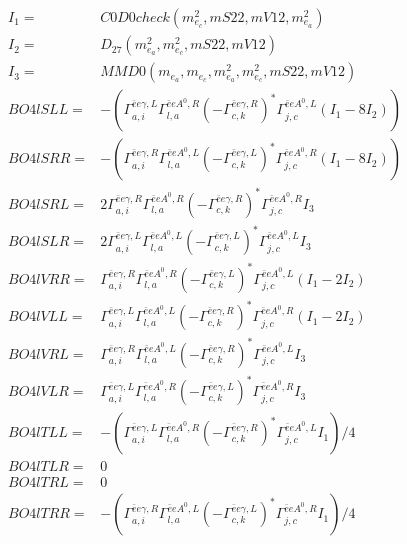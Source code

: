 \documentclass[A4,landscape]{article}
\begin{document}
\begin{align} 
I_1 = & C0D0check(m^2_{e_{{c}}}, mS22, mV12, m^2_{e_{{a}}}) \\ 
I_2 = & D_{27}(m^2_{e_{{a}}}, m^2_{e_{{c}}}, mS22, mV12) \\ 
I_3 = & MMD0(m_{e_{{a}}}, m_{e_{{c}}}, m^2_{e_{{a}}}, m^2_{e_{{c}}}, mS22, mV12) \\ 
  BO4lSLL= & -( \Gamma^{\bar{e}e \gamma ,L}_{a, i} \Gamma^{\bar{e}e A^0 ,R}_{l, a} (- \Gamma^{\bar{e}e \gamma ,R} _{c, k})^* \Gamma^{\bar{e}e A^0 ,L}_{j, c} (I_1 - 8 I_2)) \\ 
  BO4lSRR= & -( \Gamma^{\bar{e}e \gamma ,R}_{a, i} \Gamma^{\bar{e}e A^0 ,L}_{l, a} (- \Gamma^{\bar{e}e \gamma ,L} _{c, k})^* \Gamma^{\bar{e}e A^0 ,R}_{j, c} (I_1 - 8 I_2)) \\ 
  BO4lSRL= & 2  \Gamma^{\bar{e}e \gamma ,R}_{a, i} \Gamma^{\bar{e}e A^0 ,R}_{l, a} (- \Gamma^{\bar{e}e \gamma ,R} _{c, k})^* \Gamma^{\bar{e}e A^0 ,R}_{j, c} I_3 \\ 
  BO4lSLR= & 2  \Gamma^{\bar{e}e \gamma ,L}_{a, i} \Gamma^{\bar{e}e A^0 ,L}_{l, a} (- \Gamma^{\bar{e}e \gamma ,L} _{c, k})^* \Gamma^{\bar{e}e A^0 ,L}_{j, c} I_3 \\ 
  BO4lVRR= &  \Gamma^{\bar{e}e \gamma ,R}_{a, i} \Gamma^{\bar{e}e A^0 ,R}_{l, a} (- \Gamma^{\bar{e}e \gamma ,L} _{c, k})^* \Gamma^{\bar{e}e A^0 ,L}_{j, c} (I_1 - 2 I_2) \\ 
  BO4lVLL= &  \Gamma^{\bar{e}e \gamma ,L}_{a, i} \Gamma^{\bar{e}e A^0 ,L}_{l, a} (- \Gamma^{\bar{e}e \gamma ,R} _{c, k})^* \Gamma^{\bar{e}e A^0 ,R}_{j, c} (I_1 - 2 I_2) \\ 
  BO4lVRL= &  \Gamma^{\bar{e}e \gamma ,R}_{a, i} \Gamma^{\bar{e}e A^0 ,L}_{l, a} (- \Gamma^{\bar{e}e \gamma ,R} _{c, k})^* \Gamma^{\bar{e}e A^0 ,L}_{j, c} I_3 \\ 
  BO4lVLR= &  \Gamma^{\bar{e}e \gamma ,L}_{a, i} \Gamma^{\bar{e}e A^0 ,R}_{l, a} (- \Gamma^{\bar{e}e \gamma ,L} _{c, k})^* \Gamma^{\bar{e}e A^0 ,R}_{j, c} I_3 \\ 
  BO4lTLL= & -( \Gamma^{\bar{e}e \gamma ,L}_{a, i} \Gamma^{\bar{e}e A^0 ,R}_{l, a} (- \Gamma^{\bar{e}e \gamma ,R} _{c, k})^* \Gamma^{\bar{e}e A^0 ,L}_{j, c} I_1)/4 \\ 
  BO4lTLR= & 0 \\ 
  BO4lTRL= & 0 \\ 
  BO4lTRR= & -( \Gamma^{\bar{e}e \gamma ,R}_{a, i} \Gamma^{\bar{e}e A^0 ,L}_{l, a} (- \Gamma^{\bar{e}e \gamma ,L} _{c, k})^* \Gamma^{\bar{e}e A^0 ,R}_{j, c} I_1)/4 \\ 
\end{align} 
\end{document}
